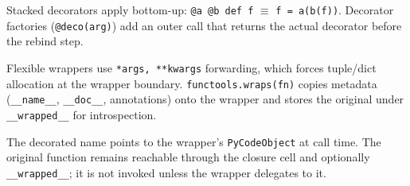 Stacked decorators apply bottom-up: \texttt{@a @b def f} $\equiv$ \texttt{f = a(b(f))}. Decorator factories (\texttt{@deco(arg)}) add an outer call that returns the actual decorator before the rebind step.

Flexible wrappers use \texttt{*args, **kwargs} forwarding, which forces tuple/dict allocation at the wrapper boundary. \texttt{functools.wraps(fn)} copies metadata (\texttt{\_\_name\_\_}, \texttt{\_\_doc\_\_}, annotations) onto the wrapper and stores the original under \texttt{\_\_wrapped\_\_} for introspection.

The decorated name points to the wrapper's \texttt{PyCodeObject} at call time. The original function remains reachable through the closure cell and optionally \texttt{\_\_wrapped\_\_}; it is not invoked unless the wrapper delegates to it.
